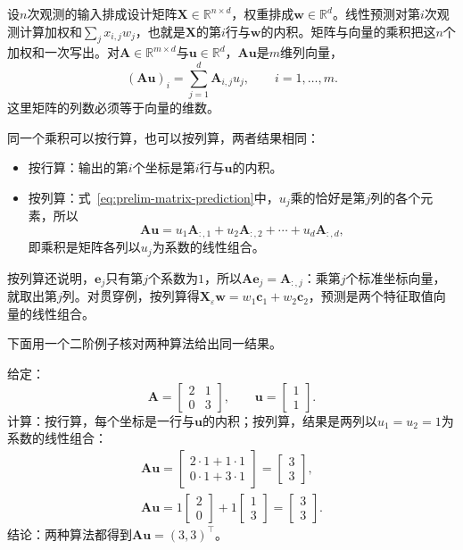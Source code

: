 设$n$次观测的输入排成设计矩阵$\bm X\in\mathbb R^{n\times d}$，权重排成$\bm w\in\mathbb R^d$。线性预测对第$i$次观测计算加权和$\sum_j x_{i,j}w_j$，也就是$\bm X$的第$i$行与$\bm w$的内积。矩阵与向量的乘积把这$n$个加权和一次写出。对$\bm A\in\mathbb R^{m\times d}$与$\bm u\in\mathbb R^d$，$\bm A\bm u$是$m$维列向量，
\begin{equation}
(\bm A\bm u)_i=\sum_{j=1}^d\bm A_{i,j}u_j,\qquad i=1,\ldots,m.
\label{eq:prelim-matrix-prediction}
\end{equation}
这里矩阵的列数必须等于向量的维数。

同一个乘积可以按行算，也可以按列算，两者结果相同：
\begin{itemize}
 \item 按行算：输出的第$i$个坐标是第$i$行与$\bm u$的内积。
 \item 按列算：式~\eqref{eq:prelim-matrix-prediction}中，$u_j$乘的恰好是第$j$列的各个元素，所以
 \[
  \bm A\bm u=u_1\bm A_{:,1}+u_2\bm A_{:,2}+\cdots+u_d\bm A_{:,d},
 \]
 即乘积是矩阵各列以$u_j$为系数的线性组合。
\end{itemize}
按列算还说明，$\bm e_j$只有第$j$个系数为$1$，所以$\bm A\bm e_j=\bm A_{:,j}$：乘第$j$个标准坐标向量，就取出第$j$列。对贯穿例，按列算得$\bm X_\varepsilon\bm w=w_1\bm c_1+w_2\bm c_2$，预测是两个特征取值向量的线性组合。

下面用一个二阶例子核对两种算法给出同一结果。
\begin{example}[按行与按列计算矩阵与向量的乘积]
\label{ex:ls-matrix-vector-rows-columns}
给定：
\[
\bm A=\begin{bmatrix}2&1\\0&3\end{bmatrix},\qquad
\bm u=\begin{bmatrix}1\\1\end{bmatrix}.
\]
计算：按行算，每个坐标是一行与$\bm u$的内积；按列算，结果是两列以$u_1=u_2=1$为系数的线性组合：
\[
\begin{gathered}
\bm A\bm u
 =\begin{bmatrix}2\cdot1+1\cdot1\\0\cdot1+3\cdot1\end{bmatrix}
 =\begin{bmatrix}3\\3\end{bmatrix},\\
\bm A\bm u=1\begin{bmatrix}2\\0\end{bmatrix}+1\begin{bmatrix}1\\3\end{bmatrix}
 =\begin{bmatrix}3\\3\end{bmatrix}.
\end{gathered}
\]
结论：两种算法都得到$\bm A\bm u=(3,3)^\top$。
\end{example}

